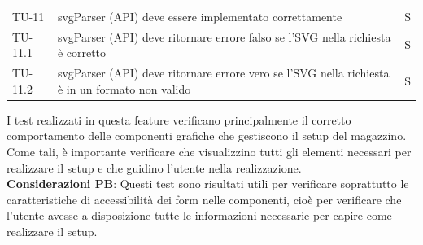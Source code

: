 \begin{xltabular}{0.9\textwidth}{X | p{0.6\textwidth} | p{0.1\textwidth} }
    TU-11 & svgParser (API) deve essere implementato correttamente & S\\
    TU-11.1 & svgParser (API) deve ritornare errore falso se l'SVG nella richiesta è corretto & S\\
    TU-11.2 & svgParser (API) deve ritornare errore vero se l'SVG nella richiesta è in un formato non valido & S\\
\end{xltabular}

\noindent I test realizzati in questa feature verificano principalmente il corretto comportamento delle componenti grafiche che gestiscono il setup del magazzino. Come tali, è importante verificare che visualizzino tutti gli elementi necessari per realizzare il setup e che guidino l'utente nella realizzazione.
\vspace{0.2cm} \\ \textbf{Considerazioni PB}: Questi test sono risultati utili per verificare soprattutto le caratteristiche di accessibilità dei form nelle componenti, cioè per verificare che l'utente avesse a disposizione tutte le informazioni necessarie per capire come realizzare il setup.


